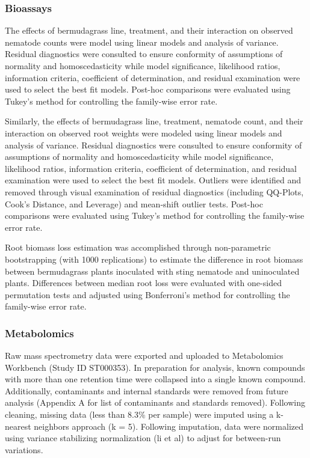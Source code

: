 \documentclass[9pt,lineno]{elife}
\begin{document}
\subsubsection{Bioassays}

The effects of bermudagrass line, treatment, and their interaction on observed nematode counts were model using linear models and analysis of variance.  Residual diagnostics were consulted to ensure conformity of assumptions of normality and homoscedasticity while model significance, likelihood ratios, information criteria, coefficient of determination, and residual examination were used to select the best fit models.  Post-hoc comparisons were evaluated using Tukey's method for controlling the family-wise error rate. 

Similarly, the effects of bermudagrass line, treatment, nematode count, and their interaction on observed root weights were modeled using linear models and analysis of variance. Residual diagnostics were consulted to ensure conformity of assumptions of normality and homoscedasticity while model significance, likelihood ratios, information criteria, coefficient of determination, and residual examination were used to select the best fit models.  Outliers were identified and removed through visual examination of residual diagnostics (including QQ-Plots, Cook's Distance, and Leverage) and mean-shift outlier tests.  Post-hoc comparisons were evaluated using Tukey's method for controlling the family-wise error rate.

Root biomass loss estimation was accomplished through non-parametric bootstrapping (with 1000 replications) to estimate the difference in root biomass between bermudagrass plants inoculated with sting nematode and uninoculated plants.  Differences between median root loss were evaluated with one-sided permutation tests and adjusted using Bonferroni's method for controlling the family-wise error rate.


\subsubsection{Metabolomics}

Raw mass spectrometry data were exported and uploaded to Metabolomics Workbench (Study ID ST000353).  In preparation for analysis, known compounds with more than one retention time were collapsed into a single known compound.  Additionally, contaminants and internal standards were removed from future analysis (Appendix A for list of contaminants and standards removed).  Following cleaning, missing data (less than 8.3\% per sample) were imputed using a k-nearest neighbors approach (k = 5).  Following imputation, data were normalized using variance stabilizing normalization (li et al) to adjust for between-run variations.  
\end{document}
